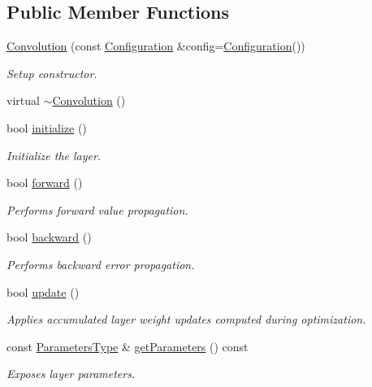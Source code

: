 \subsection*{Public Member Functions}
\begin{DoxyCompactItemize}
\item 
\hyperlink{classffnn_1_1layer_1_1_convolution_accbc6ed0e52e16e2f8d2a029d68011b5}{Convolution} (const \hyperlink{classffnn_1_1layer_1_1_convolution_a01dee52138bb0d51a1ecddb5504176be}{Configuration} \&config=\hyperlink{classffnn_1_1layer_1_1_convolution_a01dee52138bb0d51a1ecddb5504176be}{Configuration}())
\begin{DoxyCompactList}\small\item\em Setup constructor. \end{DoxyCompactList}\item 
virtual \hyperlink{classffnn_1_1layer_1_1_convolution_a82301134ee4b438304163fc62d3e800f}{$\sim$\-Convolution} ()
\item 
bool \hyperlink{classffnn_1_1layer_1_1_convolution_ab3f6d731184032f58b05651d63e22d14}{initialize} ()
\begin{DoxyCompactList}\small\item\em Initialize the layer. \end{DoxyCompactList}\item 
bool \hyperlink{classffnn_1_1layer_1_1_convolution_a5f6bf2bfc15a8020b11dabff0d03eac2}{forward} ()
\begin{DoxyCompactList}\small\item\em Performs forward value propagation. \end{DoxyCompactList}\item 
bool \hyperlink{classffnn_1_1layer_1_1_convolution_a094e10487239ea4eb043347211180f00}{backward} ()
\begin{DoxyCompactList}\small\item\em Performs backward error propagation. \end{DoxyCompactList}\item 
bool \hyperlink{classffnn_1_1layer_1_1_convolution_a66975d31de2fc164cbc9ae284f0d67f7}{update} ()
\begin{DoxyCompactList}\small\item\em Applies accumulated layer weight updates computed during optimization. \end{DoxyCompactList}\item 
const \hyperlink{classffnn_1_1layer_1_1_convolution_af2568040fc4089f93a6483da08dcc266}{Parameters\-Type} \& \hyperlink{classffnn_1_1layer_1_1_convolution_a8c7ea1047ee3f09deadf87ad267284ab}{get\-Parameters} () const 
\begin{DoxyCompactList}\small\item\em Exposes layer parameters. \end{DoxyCompactList}\end{DoxyCompactItemize}
